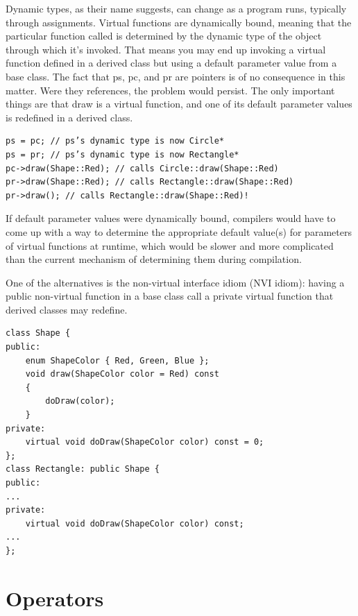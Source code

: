 \documentclass[a4paper,12pt,notitlepage]{article}
\begin{document}
Dynamic types, as their name suggests, can change as a program runs, typically through assignments. Virtual functions are dynamically bound, meaning that the particular function called is determined by the dynamic type of the object through which it's invoked. That means you may end up invoking a virtual function defined in a derived class but using a default parameter value from a base class. The fact that ps, pc, and pr are pointers is of no consequence in this matter. Were they references, the problem would persist. The only
important things are that draw is a virtual function, and one of its default parameter values is redefined in a derived class.

\begin{verbatim}
ps = pc; // ps’s dynamic type is now Circle*
ps = pr; // ps’s dynamic type is now Rectangle*
pc->draw(Shape::Red); // calls Circle::draw(Shape::Red)
pr->draw(Shape::Red); // calls Rectangle::draw(Shape::Red)
pr->draw(); // calls Rectangle::draw(Shape::Red)!
\end{verbatim}

If default parameter values were dynamically bound, compilers would have to come up with a way to determine the appropriate default value(s) for parameters of virtual functions at runtime, which would be slower and more complicated than the current mechanism of determining them during compilation.

One of the alternatives is the non-virtual interface idiom (NVI idiom): having a public non-virtual
function in a base class call a private virtual function that derived classes may redefine.

\begin{verbatim}
class Shape {
public:
    enum ShapeColor { Red, Green, Blue };
    void draw(ShapeColor color = Red) const
    {
        doDraw(color);
    }
private:
    virtual void doDraw(ShapeColor color) const = 0;
};
class Rectangle: public Shape {
public:
...
private:
    virtual void doDraw(ShapeColor color) const;
...
};
\end{verbatim}


\section{Operators}

\end{document}
